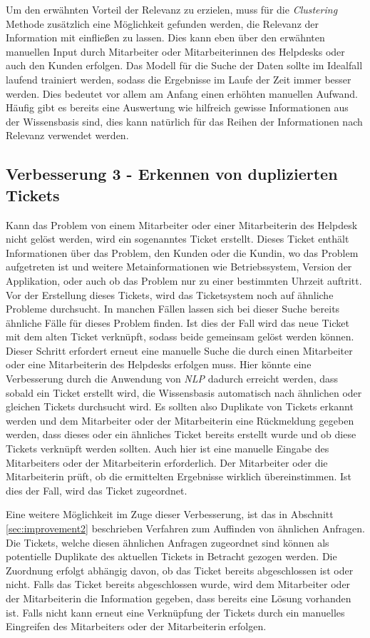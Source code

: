 Um den erwähnten Vorteil der Relevanz zu erzielen, muss für die \textit{Clustering} Methode zusätzlich eine Möglichkeit gefunden werden, die Relevanz der Information mit einfließen zu lassen. Dies kann eben über den erwähnten manuellen Input durch Mitarbeiter oder Mitarbeiterinnen des Helpdesks oder auch den Kunden erfolgen. Das Modell für die Suche der Daten sollte im Idealfall laufend trainiert werden, sodass die Ergebnisse im Laufe der Zeit immer besser werden. Dies bedeutet vor allem am Anfang einen erhöhten manuellen Aufwand. Häufig gibt es bereits eine Auswertung wie hilfreich gewisse Informationen aus der Wissensbasis sind, dies kann natürlich für das Reihen der Informationen nach Relevanz verwendet werden.

\subsection{Verbesserung 3 - Erkennen von duplizierten Tickets}
Kann das Problem von einem Mitarbeiter oder einer Mitarbeiterin des Helpdesk nicht gelöst werden, wird ein sogenanntes Ticket erstellt. Dieses Ticket enthält Informationen über das Problem, den Kunden oder die Kundin, wo das Problem aufgetreten ist und weitere Metainformationen wie Betriebssystem, Version der Applikation, oder auch ob das Problem nur zu einer bestimmten Uhrzeit auftritt. Vor der Erstellung dieses Tickets, wird das Ticketsystem noch auf ähnliche Probleme durchsucht. In manchen Fällen lassen sich bei dieser Suche bereits ähnliche Fälle für dieses Problem finden. Ist dies der Fall wird das neue Ticket mit dem alten Ticket verknüpft, sodass beide gemeinsam gelöst werden können. Dieser Schritt erfordert erneut eine manuelle Suche die durch einen Mitarbeiter oder eine Mitarbeiterin des Helpdesks erfolgen muss. Hier könnte eine Verbesserung durch die Anwendung von \textit{NLP} dadurch erreicht werden, dass sobald ein Ticket erstellt wird, die Wissensbasis automatisch nach ähnlichen oder gleichen Tickets durchsucht wird. Es sollten also Duplikate von Tickets erkannt werden und dem Mitarbeiter oder der Mitarbeiterin eine Rückmeldung gegeben werden, dass dieses oder ein ähnliches Ticket bereits erstellt wurde und ob diese Tickets verknüpft werden sollten. Auch hier ist eine manuelle Eingabe des Mitarbeiters oder der Mitarbeiterin erforderlich. Der Mitarbeiter oder die Mitarbeiterin prüft, ob die ermittelten Ergebnisse wirklich übereinstimmen. Ist dies der Fall, wird das Ticket zugeordnet.

Eine weitere Möglichkeit im Zuge dieser Verbesserung, ist das in Abschnitt \ref{sec:improvement2} beschrieben Verfahren zum Auffinden von ähnlichen Anfragen. Die Tickets, welche diesen ähnlichen Anfragen zugeordnet sind können als potentielle Duplikate des aktuellen Tickets in Betracht gezogen werden. Die Zuordnung erfolgt abhängig davon, ob das Ticket bereits abgeschlossen ist oder nicht. Falls das Ticket bereits abgeschlossen wurde, wird dem Mitarbeiter oder der Mitarbeiterin die Information gegeben, dass bereits eine Lösung vorhanden ist. Falls nicht kann erneut eine Verknüpfung der Tickets durch ein manuelles Eingreifen des Mitarbeiters oder der Mitarbeiterin erfolgen.

